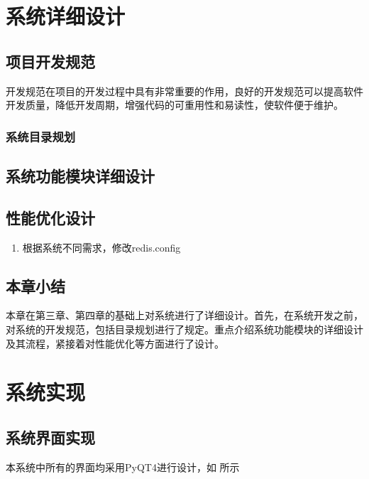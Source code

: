 \documentclass{zjutthesis}
\begin{document}
\chapter{系统详细设计}
\section{项目开发规范}
开发规范在项目的开发过程中具有非常重要的作用，良好的开发规范可以提高软件开发质量，降低开发周期，增强代码的可重用性和易读性，使软件便于维护。

\subsection{系统目录规划}

\section{系统功能模块详细设计}

\section{性能优化设计}
\begin{enumerate}[label=（\arabic*）]
\item{根据系统不同需求，修改redis.config}
\end{enumerate}

\section{本章小结}
本章在第三章、第四章的基础上对系统进行了详细设计。首先，在系统开发之前，对系统的开发规范，包括目录规划进行了规定。重点介绍系统功能模块的详细设计及其流程，紧接着对性能优化等方面进行了设计。


\chapter{系统实现}

\section{系统界面实现}
本系统中所有的界面均采用PyQT4进行设计，如%
所示
\end{document}
